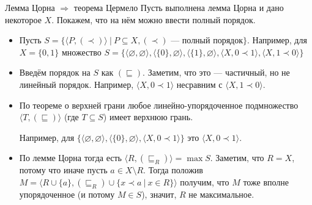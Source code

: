 \documentclass[aspectratio=169]{beamer}
\begin{document}
\begin{frame}{Лемма Цорна $\Rightarrow$ теорема Цермело}
Пусть выполнена лемма Цорна и дано некоторое $X$. Покажем, что на нём можно ввести полный порядок.
\begin{itemize}
\item Пусть $S = \{ \langle P, (\prec)\rangle \ |\ P \subseteq X, (\prec)\text{ --- полный порядок} \}$.
{\color{gray}Например, для $X = \{0,1\}$ множество
$S = \{
\langle\varnothing,\varnothing\rangle,
\langle \{0\},\varnothing\rangle,
\langle\{1\},\varnothing\rangle,
\langle X, 0 \prec 1\rangle,
\langle X, 1 \prec 0\rangle
\}$}

\item Введём порядок на $S$ как $(\sqsubseteq)$. Заметим, что это --- частичный, но не линейный порядок. 
{\color{gray}Например, $\langle X, 0 \prec 1\rangle$ несравним с $\langle X, 1 \prec 0\rangle$.}

\item По теореме о верхней грани любое линейно-упорядоченное подмножество 
$\langle T, (\sqsubseteq) \rangle$ (где $T \subseteq S$) имеет
верхнюю грань.

{\color{gray}Например, 
для $\{\langle\varnothing,\varnothing\rangle,
\langle \{0\},\varnothing\rangle,
\langle X, 0 \prec 1\rangle\}$ это $\langle X, 0 \prec 1\rangle$.}

\item По лемме Цорна тогда есть $\langle R, (\sqsubseteq_R)\rangle = \max S$. Заметим, что $R = X$, потому что иначе пусть
$a \in X\setminus R$. Тогда положив $M = \langle R\cup\{a\}, (\sqsubseteq_R)\cup\{x\prec a\ |\ x \in R\} \rangle$
получим, что $M$ тоже вполне упорядоченное (и потому $M \in S$), значит, $R$ не максимальное.
\end{itemize}
\end{frame}
\end{document}
